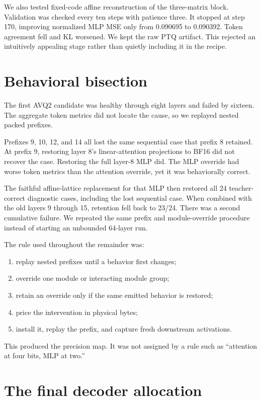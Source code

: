 \documentclass[10pt,twocolumn]{article}
\begin{document}
We also tested fixed-code affine reconstruction of the three-matrix block. Validation was checked every ten steps with patience three. It stopped at step 170, improving normalized MLP MSE only from 0.090695 to 0.090392. Token agreement fell and KL worsened. We kept the raw PTQ artifact. This rejected an intuitively appealing stage rather than quietly including it in the recipe.

\section{Behavioral bisection}

The first AVQ2 candidate was healthy through eight layers and failed by sixteen. The aggregate token metrics did not locate the cause, so we replayed nested packed prefixes.

Prefixes 9, 10, 12, and 14 all lost the same sequential case that prefix 8 retained. At prefix 9, restoring layer 8's linear-attention projections to BF16 did not recover the case. Restoring the full layer-8 MLP did. The MLP override had worse token metrics than the attention override, yet it was behaviorally correct.

The faithful affine-lattice replacement for that MLP then restored all 24 teacher-correct diagnostic cases, including the lost sequential case. When combined with the old layers 9 through 15, retention fell back to 23/24. There was a second cumulative failure. We repeated the same prefix and module-override procedure instead of starting an unbounded 64-layer run.

The rule used throughout the remainder was:

\begin{enumerate}
\item replay nested prefixes until a behavior first changes;
\item override one module or interacting module group;
\item retain an override only if the same emitted behavior is restored;
\item price the intervention in physical bytes;
\item install it, replay the prefix, and capture fresh downstream activations.
\end{enumerate}

This produced the precision map. It was not assigned by a rule such as ``attention at four bits, MLP at two.''

\section{The final decoder allocation}
\end{document}
